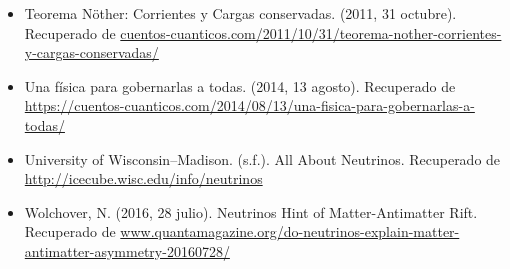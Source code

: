 \documentclass[paper=a4paper, fontsize=12pt]{scrartcl} %
\numberwithin{equation}{section} %
\numberwithin{figure}{section} %
\numberwithin{table}{section} %
\begin{document}
\begin{itemize}
\item Teorema Nöther: Corrientes y Cargas conservadas. (2011, 31 octubre). Recuperado de  \url{cuentos-cuanticos.com/2011/10/31/teorema-nother-corrientes-y-cargas-conservadas/ } 



\item  Una física para gobernarlas a todas. (2014, 13 agosto). Recuperado de \url{https://cuentos-cuanticos.com/2014/08/13/una-fisica-para-gobernarlas-a-todas/ } 

\item University of Wisconsin–Madison. (s.f.). All About Neutrinos. Recuperado de \url{http://icecube.wisc.edu/info/neutrinos } 

\item Wolchover, N. (2016, 28 julio). Neutrinos Hint of Matter-Antimatter Rift. Recuperado de  \url{www.quantamagazine.org/do-neutrinos-explain-matter-antimatter-asymmetry-20160728/ } 

\end{itemize}



\end{document}
